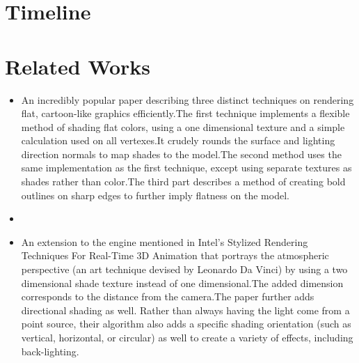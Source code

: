 \documentclass{acmsiggraph}
\begin{document}
\keywordlist

\section*{Timeline}

\section*{Related Works}

\begin{itemize}
\item
An incredibly popular paper describing three distinct techniques on rendering
flat, cartoon-like graphics efficiently.The first technique implements a
flexible method of shading flat colors, using a one dimensional texture and a
simple calculation used on all vertexes.It crudely rounds the surface and
lighting direction normals to map shades to the model.The second method uses
the same implementation as the first technique, except using separate textures
as shades rather than color.The third part describes a method of creating
bold outlines on sharp edges to further imply flatness on the
model.\cite{lake2000srt}

\item


\item
An extension to the engine mentioned in Intel's Stylized Rendering Techniques
For Real-Time 3D Animation that portrays the atmospheric perspective (an art
technique devised by Leonardo Da Vinci) by using a two dimensional shade
texture instead of one dimensional.The added dimension corresponds to the
distance from the camera.The paper further adds directional shading as well.
Rather than always having the light come from a point source, their algorithm
also adds a specific shading orientation (such as vertical, horizontal, or
circular) as well to create a variety of effects, including
back-lighting.\cite{barla2006xte}
\end{itemize}


\nocite{*}

\end{document}
